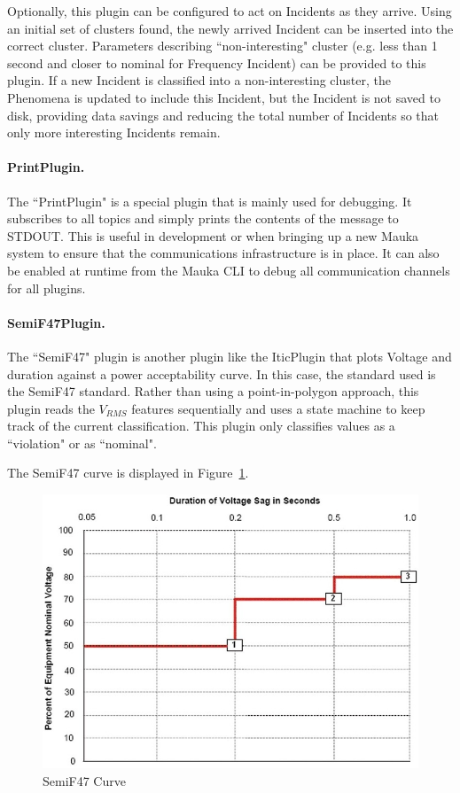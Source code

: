 Optionally, this plugin can be configured to act on Incidents as they arrive. Using an initial set of clusters found, the newly arrived Incident can be inserted into the correct cluster. Parameters describing ``non-interesting" cluster (e.g. less than 1 second and closer to nominal for Frequency Incident) can be provided to this plugin. If a new Incident is classified into a non-interesting cluster, the Phenomena is updated to include this Incident, but the Incident is not saved to disk, providing data savings and reducing the total number of Incidents so that only more interesting Incidents remain.

\paragraph{PrintPlugin.}
The ``PrintPlugin" is a special plugin that is mainly used for debugging. It subscribes to all topics and simply prints the contents of the message to STDOUT. This is useful in development or when bringing up a new Mauka system to ensure that the communications infrastructure is in place. It can also be enabled at runtime from the Mauka CLI to debug all communication channels for all plugins.

\paragraph{SemiF47Plugin.}
The ``SemiF47" plugin is another plugin like the IticPlugin that plots Voltage and duration against a power acceptability curve. In this case, the standard used is the SemiF47 standard\cite{semif47}. Rather than using a point-in-polygon approach, this plugin reads the $V_{RMS}$ features sequentially and uses a state machine to keep track of the current classification. This plugin only classifies values as a ``violation" or as ``nominal".

The SemiF47 curve is displayed in Figure~\ref{fig:SemiF47Curve}.

\begin{figure}
	\centering
	\includegraphics[width=0.6\linewidth]{figures/semif47.jpg}
	\caption{SemiF47 Curve}
	\label{fig:SemiF47Curve}
\end{figure}

